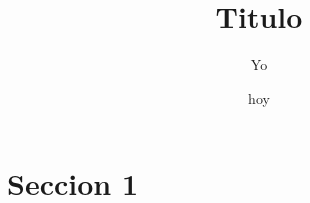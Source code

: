 \documentclass{proc}
\author{Yo}
\title{Titulo}
\date{hoy}
\begin{document}
    \maketitle
    \section*{Seccion 1}
\end{document}
